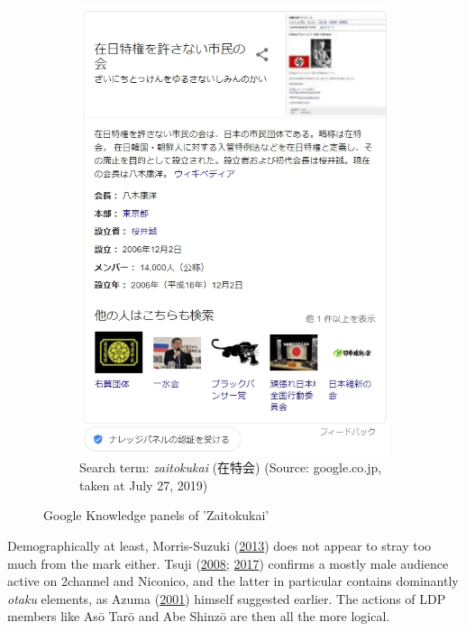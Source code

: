 \documentclass[10pt,british,A4paper,twoside]{memoir}
\begin{document}
\begin{figure}[!htb]
\begin{subfigure}[b]{0.40\textwidth}
 \includegraphics[width=\textwidth]{images/2channel/zaitokukaijp.jpg}
 \caption{Search term: \textit{zaitokukai} (在特会) (Source: google.co.jp, taken at July 27, 2019)}
 \label{fig:zaitokukaijp}
 \end{subfigure}
 \caption{Google Knowledge panels of 'Zaitokukai'}\label{fig:googlezaitokukai}
\end{figure}

Demographically at least, Morris-Suzuki
(\protect\hyperlink{ref-morris-suzuki_freedom_2013}{2013}) does not
appear to stray too much from the mark either. Tsuji
(\protect\hyperlink{ref-tsuji_eng:_2008}{2008};
\protect\hyperlink{ref-tsuji_eng._2017}{2017}) confirms a mostly male
audience active on 2channel and Niconico, and the latter in particular
contains dominantly \emph{otaku} elements, as Azuma
(\protect\hyperlink{ref-azuma_otaku:_2001}{2001}) himself suggested
earlier. The actions of LDP members like Asō Tarō and Abe Shinzō are
then all the more logical.
\end{document}
